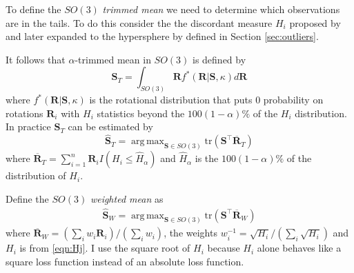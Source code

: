 \documentclass{article}\usepackage[]{graphicx}\usepackage[]{color}
\DeclareMathOperator*{\argmax}{arg\,max}
\newcommand{\WeightMean}{{\widehat{\bm S}_W}}
\newcommand{\TrimMean}{{\widehat{\bm S}_T}}
\begin{document}
To define the $SO(3)$ \emph{trimmed mean} we need to determine which observations are in the tails.  To do this consider the the discordant measure $H_i$ proposed by \cite{best1986} and later expanded to the hypersphere by \cite{figueiredo2005} defined in Section \ref{sec:outliers}.

It follows that $\alpha$-trimmed mean in $SO(3)$ is defined by
\[
\bm S_{T}=\int_{SO(3)}\bm Rf^*(\bm R|\bm S,\kappa)d\bm R
\]
where $f^*(\bm R|\bm S,\kappa)$ is the rotational distribution that puts $0$ probability on rotations $\bm R_i$ with $H_i$ statistics beyond the $100(1-\alpha)\%$ of the $H_i$ distribution.  In practice $\bm S_T$ can be estimated by
\[
\TrimMean=\argmax_{\bm S\in SO(3)}\text{tr}(\bm S^\top\overline{\bm R}_T)
\]
where $\overline{\bm R}_T=\sum_{i=1}^n\bm R_iI( H_i\leq \hat H_\alpha)$ and $\hat H_{\alpha}$ is the $100(1-\alpha)\%$ of the distribution of $H_i$.


Define the $SO(3)$ \emph{weighted mean} as
\begin{align*}
\WeightMean=\argmax_{\bm S\in SO(3)}\text{tr}(\bm S^\top\overline{\bm R}_W)
\end{align*}
where $\overline{\bm R}_W=(\sum_{i}w_i\bm R_i)/(\sum_i w_i)$, the weights $w_i^{-1}=\sqrt{H_i}/(\sum_i \sqrt{H_i})$ and $H_i$ is from \eqref{eqn:Hj}.  I use the square root of $H_i$ because $H_i$ alone behaves like a square loss function instead of an absolute loss function.
\end{document}
